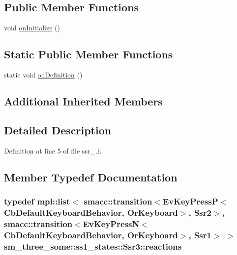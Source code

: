 \subsection*{Public Member Functions}
\begin{DoxyCompactItemize}
\item 
void \hyperlink{structsm__three__some_1_1ss1__states_1_1Ssr3_ae3c6976c1e36c083767400e7694d8aa0}{on\+Initialize} ()
\end{DoxyCompactItemize}
\subsection*{Static Public Member Functions}
\begin{DoxyCompactItemize}
\item 
static void \hyperlink{structsm__three__some_1_1ss1__states_1_1Ssr3_a8c1fc4142d98afbf1849a15795f39976}{on\+Definition} ()
\end{DoxyCompactItemize}
\subsection*{Additional Inherited Members}


\subsection{Detailed Description}


Definition at line 5 of file ssr\+\_.\+h.



\subsection{Member Typedef Documentation}
\subsubsection[{\texorpdfstring{reactions}{reactions}}]{\setlength{\rightskip}{0pt plus 5cm}typedef mpl\+::list$<$ {\bf smacc\+::transition}$<$Ev\+Key\+PressP$<$Cb\+Default\+Keyboard\+Behavior, {\bf Or\+Keyboard}$>$, {\bf Ssr2}$>$, {\bf smacc\+::transition}$<$Ev\+Key\+PressN$<$Cb\+Default\+Keyboard\+Behavior, {\bf Or\+Keyboard}$>$, {\bf Ssr1}$>$ $>$ {\bf sm\+\_\+three\+\_\+some\+::ss1\+\_\+states\+::\+Ssr3\+::reactions}}\hypertarget{structsm__three__some_1_1ss1__states_1_1Ssr3_a64398eb9ee5d9d1fa7519a67d31aa3e5}{}\label{structsm__three__some_1_1ss1__states_1_1Ssr3_a64398eb9ee5d9d1fa7519a67d31aa3e5}


